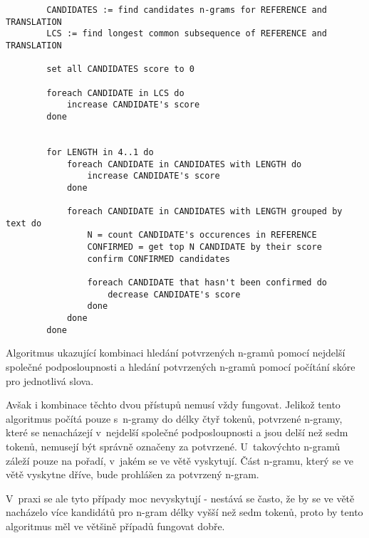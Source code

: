 \begin{algorithm}
	\begin{verbatim}
		CANDIDATES := find candidates n-grams for REFERENCE and TRANSLATION
		LCS := find longest common subsequence of REFERENCE and TRANSLATION

		set all CANDIDATES score to 0

		foreach CANDIDATE in LCS do
		    increase CANDIDATE's score
		done


		for LENGTH in 4..1 do
		    foreach CANDIDATE in CANDIDATES with LENGTH do
		        increase CANDIDATE's score
		    done

		    foreach CANDIDATE in CANDIDATES with LENGTH grouped by text do
		        N = count CANDIDATE's occurences in REFERENCE
		        CONFIRMED = get top N CANDIDATE by their score
		        confirm CONFIRMED candidates
		        
		        foreach CANDIDATE that hasn't been confirmed do
		            decrease CANDIDATE's score
		        done
		    done
		done
	\end{verbatim}
	\caption{
		Algoritmus ukazující kombinaci hledání potvrzených \mbox{n-gramů} pomocí nejdelší společné podposloupnosti
		a hledání potvrzených \mbox{n-gramů} pomocí počítání skóre pro jednotlivá slova.
	}
	\label{alg:confirmed}
\end{algorithm}



Avšak i kombinace těchto dvou přístupů nemusí vždy fungovat.
Jelikož tento algoritmus počítá pouze s~\mbox{n-gramy} do délky čtyř tokenů,
  potvrzené \mbox{n-gramy},
  které se nenacházejí v~nejdelší společné podposloupnosti a jsou delší než sedm tokenů,
  nemusejí být správně označeny za potvrzené.
U~takovýchto \mbox{n-gramů} záleží pouze na pořadí, v~jakém se ve větě vyskytují.
Část \mbox{n-gramu},
  který se ve větě vyskytne dříve,
  bude prohlášen za potvrzený \mbox{n-gram}.

V~praxi se ale tyto případy moc nevyskytují -
  nestává se často, že by se ve větě nacházelo více kandidátů pro \mbox{n-gram} délky vyšší než sedm tokenů,
  proto by tento algoritmus měl ve většině případů fungovat dobře.


